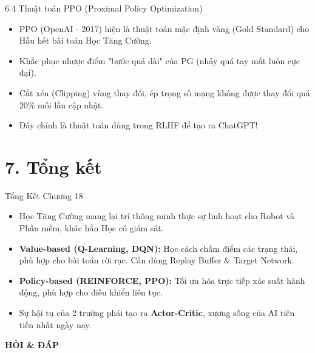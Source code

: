 \documentclass[aspectratio=169, 12pt]{beamer}
\begin{document}
\begin{frame}{6.4 Thuật toán PPO (Proximal Policy Optimization)}
    \begin{itemize}
        \item PPO (OpenAI - 2017) hiện là thuật toán mặc định vàng (Gold Standard) cho Hầu hết bài toán Học Tăng Cường.
        \item Khắc phục nhược điểm "bước quá dài" của PG (nhảy quá tay mất luôn cực đại).
        \item Cắt xén (Clipping) vùng thay đổi, ép trọng số mạng không được thay đổi quá 20\% mỗi lần cập nhật.
        \item Đây chính là thuật toán dùng trong RLHF để tạo ra ChatGPT!
    \end{itemize}
\end{frame}


\section{7. Tổng kết}

\begin{frame}{Tổng Kết Chương 18}
    \begin{itemize}
        \item Học Tăng Cường mang lại trí thông minh thực sự linh hoạt cho Robot và Phần mềm, khác hẳn Học có giám sát.
        \item \textbf{Value-based (Q-Learning, DQN):} Học cách chấm điểm các trạng thái, phù hợp cho bài toán rời rạc. Cần dùng Replay Buffer \& Target Network.
        \item \textbf{Policy-based (REINFORCE, PPO):} Tối ưu hóa trực tiếp xác suất hành động, phù hợp cho điều khiển liên tục.
        \item Sự hội tụ của 2 trường phái tạo ra \textbf{Actor-Critic}, xương sống của AI tiên tiến nhất ngày nay.
    \end{itemize}
\end{frame}

\begin{frame}
    \centering
    \Huge \textbf{HỎI \& ĐÁP}
\end{frame}
\end{document}
